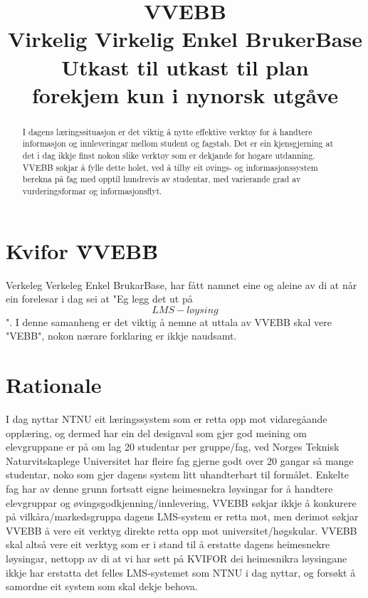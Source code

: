 \documentclass[12pt]{article}
\title{VVEBB \\ Virkelig Virkelig Enkel BrukerBase \\ Utkast til utkast til plan \\ forekjem kun i nynorsk utgåve}
\date{}
\begin{document}
  \maketitle 
  
  \begin{abstract}
  I dagens læringssituasjon er det viktig å nytte effektive verktøy for å handtere informasjon
  og innleveringar mellom student og fagstab. Det er ein kjensgjerning at det i dag ikkje finst
  nokon slike verktøy som er dekjande for høgare utdanning. VVEBB søkjar å fylle dette holet, ved
  å tilby eit øvings- og informasjonssystem berekna på fag med opptil hundrevis av studentar, med
  varierande grad av vurderingsformar og informasjonsflyt.
  \end{abstract}
  
  \section{Kvifor \"VVEBB\"}
  Verkeleg Verkeleg Enkel BrukarBase, har fått namnet eine og aleine av di at når ein forelesar i
  dag sei at "Eg legg det ut på \[LMS-løysing\]". I denne samanheng er det viktig å nemne at uttala
  av VVEBB skal vere "VEBB", nokon nærare forklaring er ikkje naudsamt.
  
  \section{Rationale}
  I dag nyttar NTNU eit læringssystem som er retta opp mot vidaregåande opplæring, og dermed har ein
  del designval som gjer god meining om elevgruppane er på om lag 20 studentar per gruppe/fag, ved
  Norges Teknisk Naturvitskaplege Universitet har fleire fag gjerne godt over 20 gangar så mange studentar,
  noko som gjer dagens system litt uhandterbart til formålet. Enkelte fag har av denne grunn fortsatt
  eigne heimesnekra løysingar for å handtere elevgruppar og øvingsgodkjenning/innlevering, VVEBB søkjar
  ikkje å konkurere på vilkåra/markedsgruppa dagens LMS-system er retta mot, men derimot søkjar VVEBB å
  vere eit verktyg direkte retta opp mot universitet/høgskular. VVEBB skal altså vere eit verktyg som er
  i stand til å erstatte dagens heimesnekre løysingar, nettopp av di at vi har sett på KVIFOR dei heimesnikra
  løysingane ikkje har erstatta det felles LMS-systemet som NTNU i dag nyttar, og forsøkt å samordne eit
  system som skal dekje behova.
  
  
\end{document}
